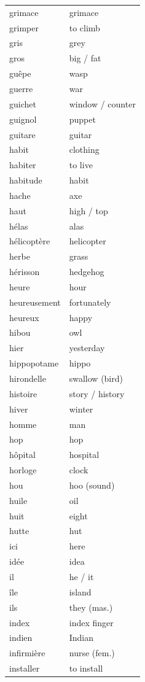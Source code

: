 \documentclass[12pt,a4paper]{article}
\begin{document}
\begin{longtable}{p{4cm} p{6cm}}
grimace & grimace \\
grimper & to climb \\
gris & grey \\
gros & big / fat \\
guêpe & wasp \\
guerre & war \\
guichet & window / counter \\
guignol & puppet \\
guitare & guitar \\
habit & clothing \\
habiter & to live \\
habitude & habit \\
hache & axe \\
haut & high / top \\
hélas & alas \\
hélicoptère & helicopter \\
herbe & grass \\
hérisson & hedgehog \\
heure & hour \\
heureusement & fortunately \\
heureux & happy \\
hibou & owl \\
hier & yesterday \\
hippopotame & hippo \\
hirondelle & swallow (bird) \\
histoire & story / history \\
hiver & winter \\
homme & man \\
hop & hop \\
hôpital & hospital \\
horloge & clock \\
hou & hoo (sound) \\
huile & oil \\
huit & eight \\
hutte & hut \\
ici & here \\
idée & idea \\
il & he / it \\
île & island \\
ils & they (mas.) \\
index & index finger \\
indien & Indian \\
infirmière & nurse (fem.) \\
installer & to install \\

\end{longtable}
\end{document}
